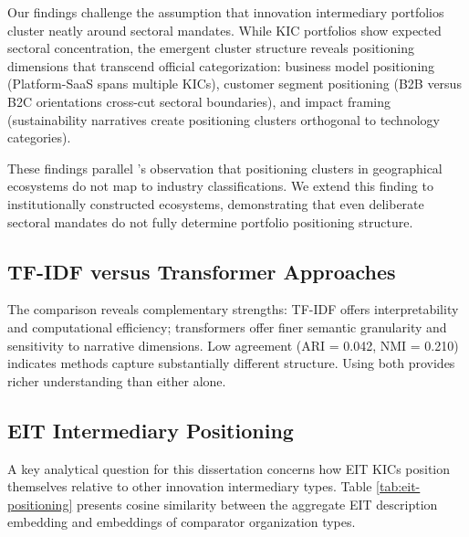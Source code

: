 \documentclass[../main.tex]{subfiles}
\begin{document}
Our findings challenge the assumption that innovation intermediary portfolios cluster neatly around sectoral mandates. While KIC portfolios show expected sectoral concentration, the emergent cluster structure reveals positioning dimensions that transcend official categorization: business model positioning (Platform-SaaS spans multiple KICs), customer segment positioning (B2B versus B2C orientations cross-cut sectoral boundaries), and impact framing (sustainability narratives create positioning clusters orthogonal to technology categories).

These findings parallel \cite{basole2019visual}'s observation that positioning clusters in geographical ecosystems do not map to industry classifications. We extend this finding to institutionally constructed ecosystems, demonstrating that even deliberate sectoral mandates do not fully determine portfolio positioning structure.

\subsection{TF-IDF versus Transformer Approaches}

The comparison reveals complementary strengths: TF-IDF offers interpretability and computational efficiency; transformers offer finer semantic granularity and sensitivity to narrative dimensions. Low agreement (ARI = 0.042, NMI = 0.210) indicates methods capture substantially different structure. Using both provides richer understanding than either alone.

\subsection{EIT Intermediary Positioning}

A key analytical question for this dissertation concerns how EIT KICs position themselves relative to other innovation intermediary types. Table \ref{tab:eit-positioning} presents cosine similarity between the aggregate EIT description embedding and embeddings of comparator organization types.
\end{document}

